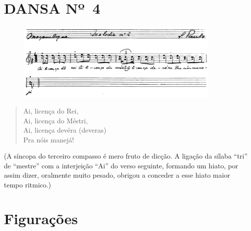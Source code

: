\section*{DANSA Nº~4}

\begin{figure}[!ht]
\centering
 \includegraphics[width=100mm]{./imgs/img6.png}
\end{figure}

\begin{verse}
Ai, licença do Rei,\\
Ai, licença do Méstri,\\
Ai, licença devéra (deveras)\\
Pra nóis manejá!
\end{verse}
(A síncopa do terceiro compasso é mero fruto de dicção. A ligação da
sílaba ``tri'' de ``mestre'' com a interjeição ``Ai'' do verso seguinte,
formando um hiato, por assim dizer, oralmente muito pesado, obrigou a
conceder a esse hiato maior tempo ritmico.)

\section*{Figurações}

